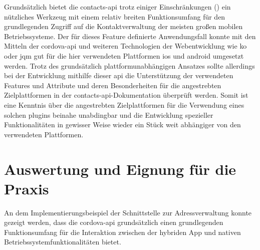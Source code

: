 Grundsätzlich bietet die \gls{contacts-api} trotz einiger Einschränkungen (\so) ein nützliches Werkzeug mit einem relativ breiten Funktionsumfang für den grundlegenden Zugriff auf die Kontaktverwaltung der meisten großen mobilen Betriebssysteme.
Der für dieses Feature definierte Anwendungsfall konnte mit den Mitteln der \gls{cordova}-\gls{api} und weiteren Technologien der Webentwicklung wie \gls{ko} oder \gls{jqm} gut für die hier verwendeten Plattformen \gls{ios} und \gls{android} umgesetzt werden.
Trotz des grundsätzlich plattformunabhängigen Ansatzes sollte allerdings bei der Entwicklung mithilfe dieser \gls{api} die Unterstützung der verwendeten Features und Attribute und deren Besonderheiten für die angestrebten Zielplattformen in der \gls{contacts-api}-Dokumentation überprüft werden.
Somit ist eine Kenntnis über die angestrebten Zielplattformen für die Verwendung eines solchen \glspl{plugin} beinahe unabdingbar und die Entwicklung spezieller Funktionalitäten in gewisser Weise wieder ein Stück weit abhängiger von den verwendeten Plattformen. %



\chapter{Auswertung und Eignung für die Praxis} %


An dem Implementierungsbeispiel der Schnittstelle zur Adressverwaltung konnte gezeigt werden, dass die \gls{cordova}-\gls{api} grundsätzlich einen grundlegenden Funktionsumfang für die Interaktion zwischen der hybriden App und nativen Betriebssystemfunktionalitäten bietet.

